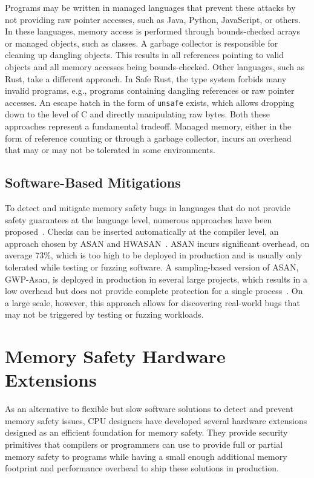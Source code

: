 Programs may be written in managed languages that prevent these attacks by not providing raw pointer accesses, such as Java, Python, JavaScript, or others.
In these languages, memory access is performed through bounds-checked arrays or managed objects, such as classes.
A garbage collector is responsible for cleaning up dangling objects.
This results in all references pointing to valid objects and all memory accesses being bounds-checked.
Other languages, such as Rust, take a different approach.
In Safe Rust, the type system forbids many invalid programs, e.g., programs containing dangling references or raw pointer accesses.
An escape hatch in the form of \texttt{unsafe} exists, which allows dropping down to the level of C and directly manipulating raw bytes.
Both these approaches represent a fundamental tradeoff.
Managed memory, either in the form of reference counting or through a garbage collector, incurs an overhead that may or may not be tolerated in some environments.

\subsection{Software-Based Mitigations}
\label{subsec:software-based-mitigations}

To detect and mitigate memory safety bugs in languages that do not provide safety guarantees at the language level, numerous approaches have been proposed~\cite{serebryany2012addresssanitizer,serebryany2023gwp,nethercote2007valgrind,serebryany2018memory}.
Checks can be inserted automatically at the compiler level, an approach chosen by \ac{ASAN} and \ac{HWASAN}~\cite{serebryany2012addresssanitizer,serebryany2018memory}.
\Ac{ASAN} incurs significant overhead, on average 73\%, which is too high to be deployed in production and is usually only tolerated while testing or fuzzing software.
A sampling-based version of \ac{ASAN}, GWP-Asan, is deployed in production in several large projects, which results in a low overhead but does not provide complete protection for a single process~\cite{serebryany2023gwp}.
On a large scale, however, this approach allows for discovering real-world bugs that may not be triggered by testing or fuzzing workloads.


\section{Memory Safety Hardware Extensions}
\label{sec:memory-safety-hardware-extensions}

As an alternative to flexible but slow software solutions to detect and prevent memory safety issues, CPU designers have developed several hardware extensions designed as an efficient foundation for memory safety.
They provide security primitives that compilers or programmers can use to provide full or partial memory safety to programs while having a small enough additional memory footprint and performance overhead to ship these solutions in production.

